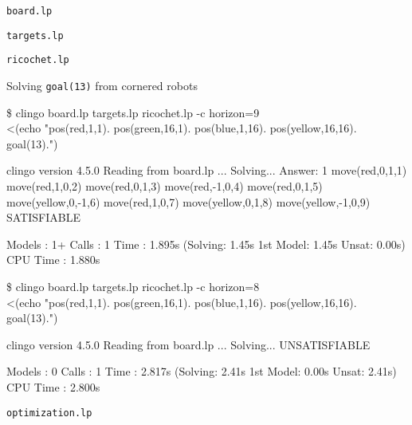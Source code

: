 \begin{frame}[fragile]{\texttt{board.lp}}
\bigskip

\end{frame}
\begin{frame}[fragile]{\texttt{targets.lp}}
\bigskip

\end{frame}
\begin{frame}[fragile]{\texttt{ricochet.lp}}
\bigskip

\end{frame}
\begin{frame}[fragile]{Solving \lstinline{goal(13)} from cornered robots}
\tiny
\begin{semiverbatim}
\$ clingo board.lp targets.lp ricochet.lp -c horizon=9 \\
        <(echo "pos(red,1,1). pos(green,16,1). pos(blue,1,16). pos(yellow,16,16).   goal(13).")\pause

clingo version 4.5.0
Reading from board.lp ...
Solving...
Answer: 1
move(red,0,1,1)     move(red,1,0,2) move(red,0,1,3)    move(red,-1,0,4) move(red,0,1,5) \\
move(yellow,0,-1,6) move(red,1,0,7) move(yellow,0,1,8) move(yellow,-1,0,9)
SATISFIABLE

Models       : 1+
Calls        : 1
Time         : 1.895s (Solving: 1.45s 1st Model: 1.45s Unsat: 0.00s)
CPU Time     : 1.880s\pause


\$ clingo board.lp targets.lp ricochet.lp -c horizon=8 \\
        <(echo "pos(red,1,1). pos(green,16,1). pos(blue,1,16). pos(yellow,16,16).   goal(13).")\pause

clingo version 4.5.0
Reading from board.lp ...
Solving...
UNSATISFIABLE

Models       : 0
Calls        : 1
Time         : 2.817s (Solving: 2.41s 1st Model: 0.00s Unsat: 2.41s)
CPU Time     : 2.800s
\end{semiverbatim}
\end{frame}
\begin{frame}[fragile]{\texttt{optimization.lp}}
\bigskip

\end{frame}
